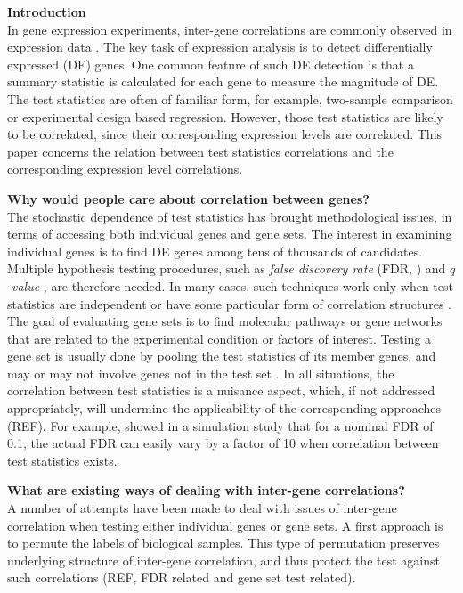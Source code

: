 \documentclass[12pt, a4paper]{article}
\begin{document}
	
	\textbf{Introduction}\\
	In gene expression experiments, inter-gene correlations are commonly observed in expression data \citep{efron2012large, qiu2005effects,barry2008statistical, efron2007correlation,storey2003positive, huang2013gene, wu2012camera}. The key task of expression analysis is to detect differentially expressed (DE) genes. One common feature of such DE detection is that a summary statistic is calculated for each gene to measure the magnitude of DE. The test statistics are often of familiar form, for example, two-sample comparison or experimental design based regression. However, those test statistics are likely to be correlated, since their corresponding expression levels are correlated. This paper concerns the relation between test statistics correlations and the corresponding expression level correlations.
	
	\textbf{Why would people care about correlation between genes?}\\
	 The stochastic dependence of test statistics has brought methodological issues, in terms of accessing both individual genes and gene sets. The interest in examining individual genes is to find DE genes among tens of thousands of candidates. Multiple hypothesis testing procedures, such as \textit{false discovery rate} (FDR, \citealt{benjamini1995controlling}) and \textit{$q$-value} \citep{storey2003positive}, are therefore needed. In many cases, such techniques work only when test statistics are independent \citep{benjamini1995controlling} or have some particular form of correlation structures \citep{benjamini2001control}. The goal of evaluating gene sets is to find molecular pathways or gene networks that are related to the experimental condition or factors of interest. Testing a gene set is usually done by pooling the test statistics of its member genes, and may or may not involve genes not in the test set \citep{goeman2007analyzing}. In all situations, the correlation between test statistics is a nuisance aspect, which, if not addressed appropriately, will undermine the applicability of the corresponding approaches (REF). For
	 example, \citet{efron2007correlation} showed in a simulation study that for a nominal FDR of 0.1, the
	 actual FDR can easily vary by a factor of 10 when correlation between test statistics exists. 
	 
	 \textbf{What are existing ways of dealing with inter-gene correlations?}\\
	 A number of attempts have been made to deal with issues of inter-gene correlation when testing either individual genes or gene sets.  A first approach is to permute the labels of biological samples. This type of permutation preserves underlying structure of inter-gene correlation, and thus protect the test against such correlations (REF, FDR related and gene set test related).
	  
\end{document}
